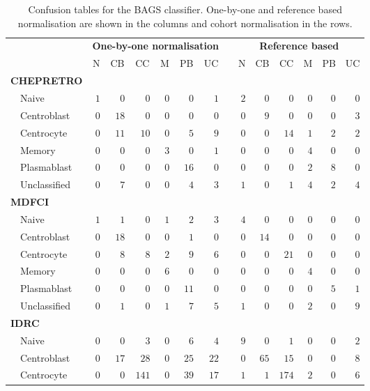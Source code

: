 \begin{table}[!tbp]
{\small
\caption{Confusion tables for the BAGS classifier. One-by-one and reference
based normalisation are shown in the columns and cohort normalisation in the
rows.\label{tab:BAGShemaclass}} 
\begin{center}
\begin{tabular}{lrrrrrrcrrrrrr}
\hline\hline
\multicolumn{1}{l}{\bfseries }&\multicolumn{6}{c}{\bfseries One-by-one normalisation}&\multicolumn{1}{c}{\bfseries }&\multicolumn{6}{c}{\bfseries Reference based}\tabularnewline
\cline{2-7} \cline{9-14}
\multicolumn{1}{l}{}&\multicolumn{1}{c}{N}&\multicolumn{1}{c}{CB}&\multicolumn{1}{c}{CC}&\multicolumn{1}{c}{M}&\multicolumn{1}{c}{PB}&\multicolumn{1}{c}{UC}&\multicolumn{1}{c}{}&\multicolumn{1}{c}{N}&\multicolumn{1}{c}{CB}&\multicolumn{1}{c}{CC}&\multicolumn{1}{c}{M}&\multicolumn{1}{c}{PB}&\multicolumn{1}{c}{UC}\tabularnewline
\hline
{\bfseries CHEPRETRO}&&&&&&&&&&&&&\tabularnewline
~~Naive&$1$&$ 0$&$  0$&$0$&$ 0$&$ 1$&&$2$&$ 0$&$  0$&$ 0$&$ 0$&$ 0$\tabularnewline
~~Centroblast&$0$&$18$&$  0$&$0$&$ 0$&$ 0$&&$0$&$ 9$&$  0$&$ 0$&$ 0$&$ 3$\tabularnewline
~~Centrocyte&$0$&$11$&$ 10$&$0$&$ 5$&$ 9$&&$0$&$ 0$&$ 14$&$ 1$&$ 2$&$ 2$\tabularnewline
~~Memory&$0$&$ 0$&$  0$&$3$&$ 0$&$ 1$&&$0$&$ 0$&$  0$&$ 4$&$ 0$&$ 0$\tabularnewline
~~Plasmablast&$0$&$ 0$&$  0$&$0$&$16$&$ 0$&&$0$&$ 0$&$  0$&$ 2$&$ 8$&$ 0$\tabularnewline
~~Unclassified&$0$&$ 7$&$  0$&$0$&$ 4$&$ 3$&&$1$&$ 0$&$  1$&$ 4$&$ 2$&$ 4$\tabularnewline
\hline
{\bfseries MDFCI}&&&&&&&&&&&&&\tabularnewline
~~Naive&$1$&$ 1$&$  0$&$1$&$ 2$&$ 3$&&$4$&$ 0$&$  0$&$ 0$&$ 0$&$ 0$\tabularnewline
~~Centroblast&$0$&$18$&$  0$&$0$&$ 1$&$ 0$&&$0$&$14$&$  0$&$ 0$&$ 0$&$ 0$\tabularnewline
~~Centrocyte&$0$&$ 8$&$  8$&$2$&$ 9$&$ 6$&&$0$&$ 0$&$ 21$&$ 0$&$ 0$&$ 0$\tabularnewline
~~Memory&$0$&$ 0$&$  0$&$6$&$ 0$&$ 0$&&$0$&$ 0$&$  0$&$ 4$&$ 0$&$ 0$\tabularnewline
~~Plasmablast&$0$&$ 0$&$  0$&$0$&$11$&$ 0$&&$0$&$ 0$&$  0$&$ 0$&$ 5$&$ 1$\tabularnewline
~~Unclassified&$0$&$ 1$&$  0$&$1$&$ 7$&$ 5$&&$1$&$ 0$&$  0$&$ 2$&$ 0$&$ 9$\tabularnewline
\hline
{\bfseries IDRC}&&&&&&&&&&&&&\tabularnewline
~~Naive&$0$&$ 0$&$  3$&$0$&$ 6$&$ 4$&&$9$&$ 0$&$  1$&$ 0$&$ 0$&$ 2$\tabularnewline
~~Centroblast&$0$&$17$&$ 28$&$0$&$25$&$22$&&$0$&$65$&$ 15$&$ 0$&$ 0$&$ 8$\tabularnewline
~~Centrocyte&$0$&$ 0$&$141$&$0$&$39$&$17$&&$1$&$ 1$&$174$&$ 2$&$ 0$&$ 6$\tabularnewline

\end{tabular}
\end{center}}
\end{table}
